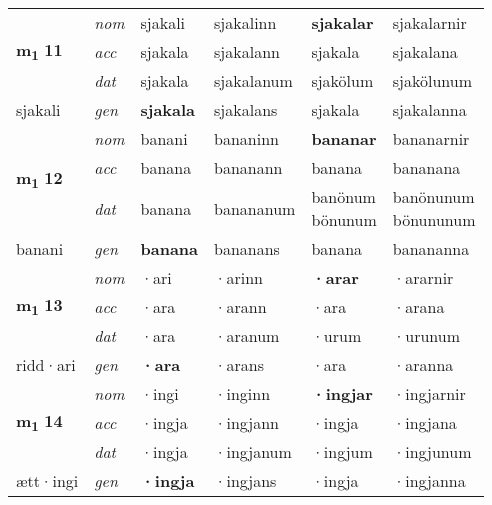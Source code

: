 \begin{longtable}[l]{X>{\footnotesize\itshape}XXXXX}
\multirow{3}{*}{{{\textbf{m{\textsubscript{1}}} \Large{\textbf{11}}}}} & nom & sjakali & sjakalinn & \textbf{sjakalar} & sjakalarnir \\*
 & acc & sjakala & sjakalann & sjakala & sjakalana \\*
 & dat & sjakala & sjakalanum & sjakölum & sjakölunum \\*
 {\footnotesize{sjakali}} & gen & \textbf{sjakala} & sjakalans & sjakala & sjakalanna \\


\multirow{3}{*}{{{\textbf{m{\textsubscript{1}}} \Large{\textbf{12}}}}} & nom & banani & bananinn & \textbf{bananar} & bananarnir \\*
 & acc & banana & bananann & banana & bananana \\*
 & dat & banana & banananum & \specialcell{banönum\\ bönunum} & \specialcell{banönunum\\ bönununum} \\*
 {\footnotesize{banani}} & gen & \textbf{banana} & bananans & banana & banananna \\
\cmidrule{1-6}

\multirow{3}{*}{{{\textbf{m{\textsubscript{1}}} \Large{\textbf{13}}}}} & nom & ·ari & ·arinn & \textbf{·arar} & ·ararnir \\*
 & acc & ·ara & ·arann & ·ara & ·arana \\*
 & dat & ·ara & ·aranum & ·urum & ·urunum \\*
 {\footnotesize{ridd\allowbreak ·ari}} & gen & \textbf{·ara} & ·arans & ·ara & ·aranna \\
\cmidrule{1-6}

\multirow{3}{*}{{{\textbf{m{\textsubscript{1}}} \Large{\textbf{14}}}}} & nom & ·ingi & ·inginn & \textbf{·ingjar} & ·ingjarnir \\*
 & acc & ·ingja & ·ingjann & ·ingja & ·ingjana \\*
 & dat & ·ingja & ·ingjanum & ·ingjum & ·ingjunum \\*
 {\footnotesize{ætt\allowbreak ·ingi}} & gen & \textbf{·ingja} & ·ingjans & ·ingja & ·ingjanna \\
\cmidrule{1-6}


\end{longtable}
